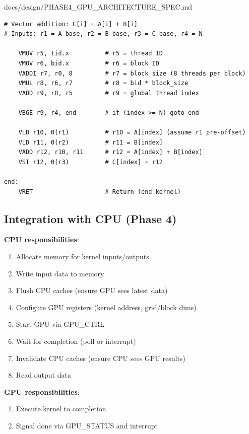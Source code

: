 \begin{relocated}{docs/design/PHASE4_GPU_ARCHITECTURE_SPEC.md}
\begin{lstlisting}[language={}]
# Vector addition: C[i] = A[i] + B[i]
# Inputs: r1 = A_base, r2 = B_base, r3 = C_base, r4 = N

    VMOV r5, tid.x          # r5 = thread ID
    VMOV r6, bid.x          # r6 = block ID
    VADDI r7, r0, 8         # r7 = block size (8 threads per block)
    VMUL r8, r6, r7         # r8 = bid * block_size
    VADD r9, r8, r5         # r9 = global thread index

    VBGE r9, r4, end        # if (index >= N) goto end

    VLD r10, 0(r1)          # r10 = A[index] (assume r1 pre-offset)
    VLD r11, 0(r2)          # r11 = B[index]
    VADD r12, r10, r11      # r12 = A[index] + B[index]
    VST r12, 0(r3)          # C[index] = r12

end:
    VRET                    # Return (end kernel)
\end{lstlisting}

\subsection{Integration with CPU (Phase 4)}\label{ds:ch:phase4-gpu-architecture:integration-with-cpu-phase-4}

\textbf{CPU responsibilities}:

\begin{enumerate}
\def\labelenumi{\arabic{enumi}.}
\tightlist
\item
  Allocate memory for kernel inputs/\allowbreak{}outputs
\item
  Write input data to memory
\item
  Flush CPU caches (ensure GPU sees latest data)
\item
  Configure GPU registers (kernel address, grid/\allowbreak{}block dims)
\item
  Start GPU via GPU\_CTRL
\item
  Wait for completion (poll or interrupt)
\item
  Invalidate CPU caches (ensure CPU sees GPU results)
\item
  Read output data
\end{enumerate}

\textbf{GPU responsibilities}:

\begin{enumerate}
\def\labelenumi{\arabic{enumi}.}
\tightlist
\item
  Execute kernel to completion
\item
  Signal done via GPU\_\allowbreak{}STATUS and interrupt
\end{enumerate}


\end{relocated}
